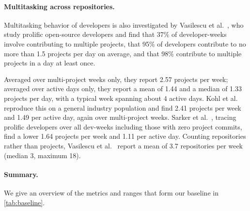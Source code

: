 \documentclass[smallextended]{svjour3}
\begin{document}
\paragraph{Multitasking across repositories.}
Multitasking behavior of developers is also investigated by Vasilescu et al.~\cite{Vasilescu2016sky}, who study prolific open-source developers and find that 37\% of developer-weeks involve contributing to multiple projects, that 95\% of developers contribute to no more than 1.5 projects per day on average, and that 98\% contribute to multiple projects in a day at least once. 

Averaged over multi-project weeks only, they report 2.57 projects per week; averaged over active days only, they report a mean of 1.44 and a median of 1.33 projects per day, with a typical week spanning about 4 active days. Kohl et al.~\cite{kohl2020multitasking} reproduce this on a general industry population and find 2.41 projects per week and 1.49 per active day, again over multi-project weeks. Sarker et al.~\cite{sarker2019developer}, tracing prolific developers over all dev-weeks including those with zero project commits, find a lower 1.64 projects per week and 1.11 per active day.
Counting repositories rather than projects, Vasilescu et al.~\cite{Vasilescu2016sky} report a mean of 3.7 repositories per week (median 3, maximum 18).



\paragraph{Summary.}
We give an overview of the metrics and ranges that form our baseline in \autoref{tab:baseline}.
\end{document}

